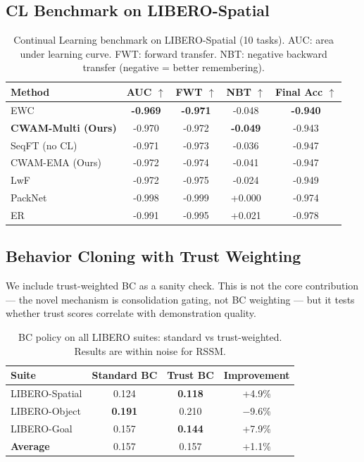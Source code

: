 \documentclass{article}
\begin{document}
\subsection{CL Benchmark on LIBERO-Spatial}

\begin{table}[h]
\centering
\caption{Continual Learning benchmark on LIBERO-Spatial (10 tasks). AUC: area under learning curve. FWT: forward transfer. NBT: negative backward transfer (negative = better remembering).}
\label{tab:cl_benchmark}
\small
\begin{tabular}{lcccc}
\toprule
Method & AUC $\uparrow$ & FWT $\uparrow$ & NBT $\uparrow$ & Final Acc $\uparrow$ \\
\midrule
EWC & \textbf{-0.969} & \textbf{-0.971} & -0.048 & \textbf{-0.940} \\
\textbf{CWAM-Multi (Ours)} & -0.970 & -0.972 & \textbf{-0.049} & -0.943 \\
SeqFT (no CL) & -0.971 & -0.973 & -0.036 & -0.947 \\
CWAM-EMA (Ours) & -0.972 & -0.974 & -0.041 & -0.947 \\
LwF & -0.972 & -0.975 & -0.024 & -0.949 \\
PackNet & -0.998 & -0.999 & +0.000 & -0.974 \\
ER & -0.991 & -0.995 & +0.021 & -0.978 \\
\bottomrule
\end{tabular}
\end{table}

\subsection{Behavior Cloning with Trust Weighting}

We include trust-weighted BC as a sanity check. This is not the core contribution — the novel mechanism is consolidation gating, not BC weighting — but it tests whether trust scores correlate with demonstration quality.

\begin{table}[h]
\centering
\caption{BC policy on all LIBERO suites: standard vs trust-weighted. Results are within noise for RSSM.}
\label{tab:bc_trust}
\small
\begin{tabular}{lccc}
\toprule
Suite & Standard BC & Trust BC & Improvement \\
\midrule
LIBERO-Spatial & 0.124 & \textbf{0.118} & +4.9\% \\
LIBERO-Object & \textbf{0.191} & 0.210 & $-$9.6\% \\
LIBERO-Goal & 0.157 & \textbf{0.144} & +7.9\% \\
\midrule
\textbf{Average} & 0.157 & 0.157 & +1.1\% \\
\bottomrule
\end{tabular}
\end{table}
\end{document}
